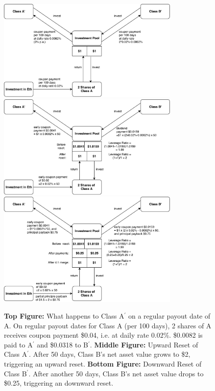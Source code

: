 \documentclass[final,pdftex]{ectaart}
\newcommand{\Ap}{A\ensuremath{^\prime}\xspace}
\newcommand{\Bp}{B\ensuremath{^\prime}\xspace}
\theoremstyle{plain}
\begin{document}
\begin{figure}[p!]
\centering
	\includegraphics[width=0.8\textwidth]{Ap_periodic}
	\vspace{1em}
	\includegraphics[width=0.8\textwidth]{Ap_upward}
	\vspace{1em}
	\includegraphics[width=0.8\textwidth]{Ap_downward}
	\caption{{\bf Top Figure:} What happens to Class \Ap on a regular payout date of A. On regular payout dates for Class A (per 100 days), 2 shares of A receives coupon payment \$0.04, i.e. at daily rate 0.02\%. \$0.0082 is paid to \Ap and \$0.0318 to \Bp. {\bf Middle Figure:} Upward Reset of Class \Ap. After 50 days, Class B's net asset value grows to \$2, triggering an upward reset. {\bf Bottom Figure:} Downward Reset of Class \Bp. After another 50 days, Class B's net asset value drops to \$0.25, triggering an downward reset. }\label{fig:Ap}
\end{figure}
\end{document}
